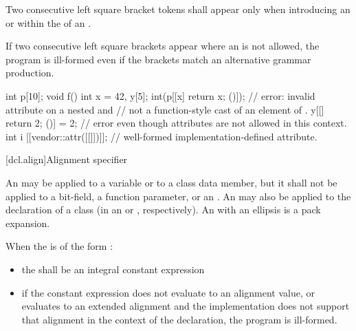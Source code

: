 \pnum
Two consecutive left square bracket tokens shall appear only
when introducing an  or
within the  of
an .
\begin{note} If two consecutive left square brackets appear
where an  is not allowed, the program is ill-formed even
if the brackets match an alternative grammar production. \end{note} \begin{example}
\begin{codeblock}
int p[10];
void f() {
  int x = 42, y[5];
  int(p[[x] { return x; }()]);  // error: invalid attribute on a nested  and
                                // not a function-style cast of an element of .
  y[[] { return 2; }()] = 2;    // error even though attributes are not allowed in this context.
  int i [[vendor::attr([[]])]]; // well-formed implementation-defined attribute.
}
\end{codeblock}
\end{example}

[dcl.align]{Alignment specifier}%

\pnum
An 
may be applied to a variable
or to a class data member, but it shall not be applied to a bit-field, a function
parameter, or an .
An  may also be applied to the declaration
of a class (in an
 or
, respectively).
An  with an ellipsis is a pack expansion.

\pnum
When the  is of the form
  \tcode{)}:

\begin{itemize}
\item the  shall be an integral constant expression

\item if the constant expression does not evaluate to an alignment
value, or evaluates to an extended alignment and
the implementation does not support that alignment in the context of the
declaration, the program is ill-formed.
\end{itemize}

